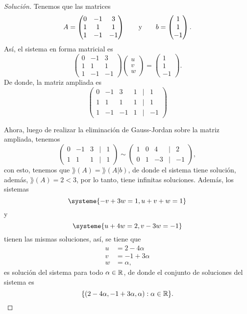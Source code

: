 \documentclass[a4,11pt]{aleph-notas}
\begin{document}
\begin{proof}[Solución]
    Tenemos que las matrices
    \[
        A = \begin{pmatrix}
            0&-1&3\\1&1&1\\1&-1&-1
        \end{pmatrix}
        \qquad\text{y}\qquad
        b = \begin{pmatrix}
            1 \\ 1\\ -1
        \end{pmatrix}.
    \]
    Así, el sistema en forma matricial es
    \[
        \begin{pmatrix}
            0&-1&3\\1&1&1\\1&-1&-1
        \end{pmatrix}
        \begin{pmatrix}
            u \\ v\\ w
        \end{pmatrix}
        =
        \begin{pmatrix}
            1 \\ 1\\ -1
        \end{pmatrix}.
    \]
    De donde, la matriz ampliada es
    \[
        \begin{pmatrix}
            0&-1&3&1&|&1\\
            1&1&1&1&|&1\\
            1&-1&-1&1&|&-1
        \end{pmatrix}
    \]
    
    Ahora, luego de realizar la eliminación de Gauss-Jordan sobre la matriz ampliada, tenemos
    \[
        \begin{pmatrix}
            0&-1&3&|&1\\
            1&1&1&|&1
        \end{pmatrix}
        \sim 
        \begin{pmatrix}
            1&0&4&|&2\\
            0&1&-3&|&-1
        \end{pmatrix},
    \]
    con esto, tenemos que $\rang(A)=\rang(A|b)$, de donde el sistema tiene solución, además, $\rang(A)=2<3$, por lo tanto, tiene infinitas soluciones. Además, los sistemas
    \[
        \systeme{
        -v+3w=1, u+v+w=1
        }
    \]
    y
    \[
        \systeme{
        u+4w=2,v-3w=-1
        }
    \]
    tienen las mismas soluciones, así, se tiene que
    \begin{align*}
        u & = 2-4\alpha\\
        v & = -1+3\alpha\\
        w & = \alpha,
    \end{align*}
    es solución del sistema para todo $\alpha\in\mathbb{R}$, de donde el conjunto de soluciones del sistema es
    \[  
        \{(2-4\alpha,-1+3\alpha,\alpha):\alpha\in\mathbb{R}\}.\qedhere
    \]
\end{proof}
\end{document}
